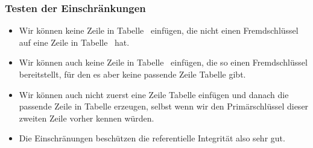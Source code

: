 \begin{frame}[t]%
\frametitle{Testen der Einschränkungen}%
\parbox{0.435\linewidth}{\small%
\begin{itemize}%
%
\item Wir können keine Zeile in Tabelle~ einfügen, die nicht einen Fremdschlüssel auf eine Zeile in Tabelle~ hat.%
%
\item<2-> Wir können auch keine Zeile in Tabelle~ einfügen, die so einen Fremdschlüssel bereitstellt, für den es aber keine passende Zeile Tabelle  gibt.%
%
\item<3-> Wir können auch nicht zuerst eine Zeile Tabelle  einfügen und danach die passende Zeile in Tabelle  erzeugen, selbst wenn wir den Primärschlüssel dieser zweiten Zeile vorher kennen würden.%
%
\item<4-> Die Einschränungen beschützen die referentielle Integrität also sehr gut.%
%
\end{itemize}%
}%
%
%
%
%
%
%
%
\end{frame}%
